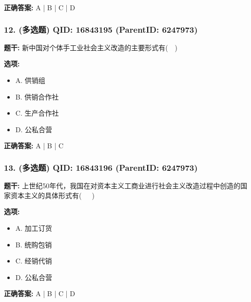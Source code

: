 \documentclass[12pt,UTF8]{ctexart}
\begin{document}
\textbf{正确答案:}
A | B | C | D

\vspace{0.3em}\hrulefill\vspace{0.7em}

\subsubsection*{12. (多选题) \small QID: 16843195 (ParentID: 6247973)}

\textbf{题干:}
新中国对个体手工业社会主义改造的主要形式有(  )



\textbf{选项:}
\begin{itemize}[leftmargin=*]

  \item A. 供销组

  \item B. 供销合作社

  \item C. 生产合作社

  \item D. 公私合营

\end{itemize}

\textbf{正确答案:}
A | B | C

\vspace{0.3em}\hrulefill\vspace{0.7em}

\subsubsection*{13. (多选题) \small QID: 16843196 (ParentID: 6247973)}

\textbf{题干:}
上世纪50年代，我国在对资本主义工商业进行社会主义改造过程中创造的国家资本主义的具体形式有(   )



\textbf{选项:}
\begin{itemize}[leftmargin=*]

  \item A. 加工订货

  \item B. 统购包销

  \item C. 经销代销

  \item D. 公私合营

\end{itemize}

\textbf{正确答案:}
A | B | C | D
\end{document}
